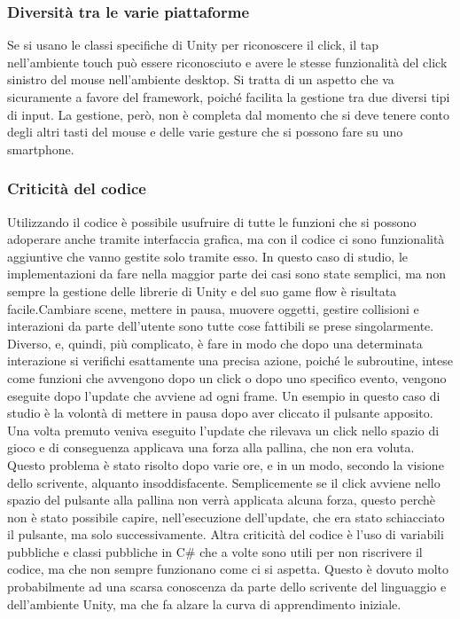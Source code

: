 \subsubsection{Diversità tra le varie piattaforme}
Se si usano le classi specifiche di Unity per riconoscere il click, il tap nell’ambiente touch può essere riconosciuto e avere le stesse funzionalità del click sinistro del mouse nell’ambiente desktop. Si tratta di un aspetto che va sicuramente a favore del framework, poiché facilita la gestione tra due diversi tipi di input. La gestione, però, non è completa dal momento che si deve tenere conto degli altri tasti del mouse e delle varie gesture che si possono fare su uno smartphone.

\subsubsection{Criticità del codice}
Utilizzando il codice è possibile usufruire di tutte le funzioni che si possono adoperare anche tramite interfaccia grafica, ma con il codice ci sono funzionalità aggiuntive che vanno gestite solo tramite esso. In questo caso di studio, le implementazioni da fare nella maggior parte dei casi sono state semplici, ma non sempre la gestione delle librerie di Unity e del suo game flow è risultata facile.Cambiare scene, mettere in pausa, muovere oggetti, gestire collisioni e interazioni da parte dell’utente sono tutte cose fattibili se prese singolarmente. Diverso, e, quindi, più complicato, è fare in modo che dopo una determinata interazione si verifichi esattamente una precisa azione, poiché le subroutine, intese come funzioni che avvengono dopo un click o dopo uno specifico evento, vengono eseguite dopo l’update che avviene ad ogni frame. 
Un esempio in questo caso di studio è la volontà di mettere in pausa dopo aver cliccato il pulsante apposito. Una volta premuto veniva eseguito l’update che rilevava un click nello spazio di gioco e di conseguenza applicava una forza alla pallina, che non era voluta. Questo problema è stato risolto dopo varie ore, e in un modo, secondo la visione dello scrivente, alquanto insoddisfacente. Semplicemente se il click avviene nello spazio del pulsante alla pallina non verrà applicata alcuna forza, questo perchè non è stato possibile capire, nell’esecuzione dell’update, che era stato schiacciato il pulsante, ma solo successivamente. Altra criticità del codice è l’uso di variabili pubbliche e classi pubbliche in C\# che a volte sono utili per non riscrivere il codice, ma che non sempre funzionano come ci si aspetta. Questo è dovuto molto probabilmente ad una scarsa conoscenza da parte dello scrivente del linguaggio e dell’ambiente Unity, ma che fa alzare la curva di apprendimento iniziale.


